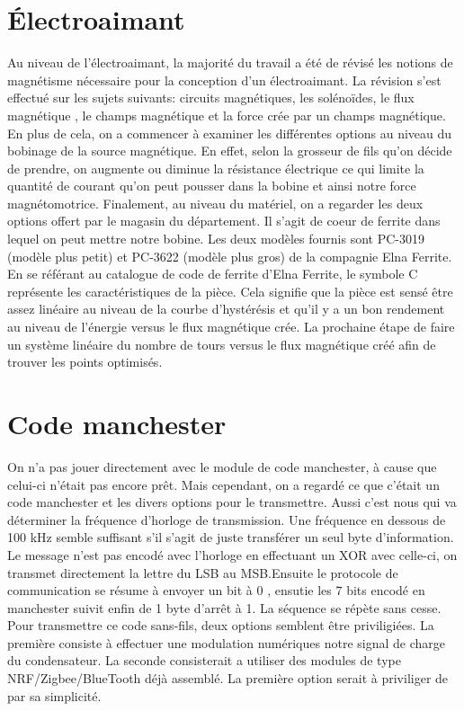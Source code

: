 \section{Électroaimant}
Au niveau de l'électroaimant, la majorité du travail a été  de révisé les notions de magnétisme nécessaire pour la conception d'un électroaimant. La révision s'est effectué sur les sujets suivants: circuits magnétiques, les solénoïdes, le flux magnétique , le champs magnétique et la force crée par un champs magnétique. En plus de cela, on a commencer à examiner les différentes options au niveau du bobinage de la source magnétique. En effet, selon la grosseur de fils qu'on décide de prendre, on augmente ou diminue la résistance électrique ce qui limite la quantité de courant qu'on peut pousser dans la bobine et ainsi notre force magnétomotrice. Finalement, au niveau du matériel, on a regarder les deux options offert par le magasin du département. Il s'agit de coeur de ferrite dans lequel on peut mettre notre bobine. Les deux modèles fournis sont PC-3019 (modèle plus petit) et PC-3622 (modèle plus gros) de la compagnie Elna Ferrite. En se référant au catalogue de code de ferrite d'Elna Ferrite, le symbole C représente les caractéristiques de la pièce. Cela signifie que la pièce est sensé être assez linéaire au niveau de la courbe d'hystérésis et qu'il y a un bon rendement au niveau de l'énergie versus le flux magnétique crée. La prochaine étape de faire un système linéaire du nombre de tours versus le flux magnétique créé afin de trouver les points optimisés.

\section{Code manchester}
On n'a pas jouer directement avec le module de code manchester, à cause que celui-ci n'était pas encore prêt. Mais cependant, on a regardé ce que c'était un code manchester et les divers options pour le transmettre. Aussi c'est nous qui va déterminer la fréquence d'horloge de transmission. Une fréquence en dessous de 100 kHz semble suffisant s'il s'agit de juste transférer un seul byte d'information. Le message n'est pas encodé avec l'horloge en effectuant un XOR avec celle-ci, on transmet directement la lettre du LSB au MSB.Ensuite le protocole de communication se résume à envoyer un bit à 0 , ensutie les 7 bits encodé en manchester suivit enfin de 1 byte d'arrêt à 1. La séquence se répète sans cesse. Pour transmettre ce code sans-fils, deux options semblent être priviligiées. La première consiste à effectuer une modulation numériques notre signal de charge du condensateur. La seconde consisterait a utiliser des modules de type NRF/Zigbee/BlueTooth déjà assemblé. La première option serait à priviliger de par sa simplicité.
